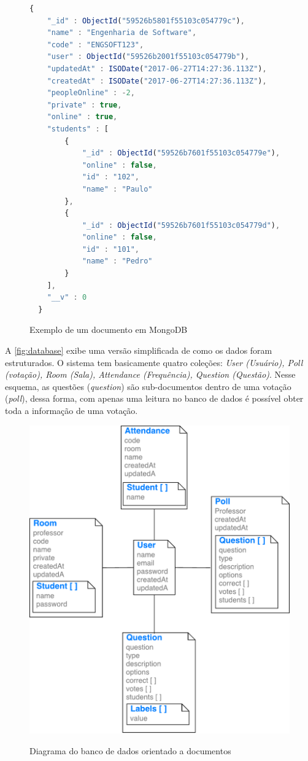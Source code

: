\begin{figure}[ht]
  \caption{Exemplo de um documento em MongoDB}
  \label{fig:mongodocument}
  \begin{lstlisting}[language=JavaScript]
  {
  	"_id" : ObjectId("59526b5801f55103c054779c"),
  	"name" : "Engenharia de Software",
  	"code" : "ENGSOFT123",
  	"user" : ObjectId("59526b2001f55103c054779b"),
  	"updatedAt" : ISODate("2017-06-27T14:27:36.113Z"),
  	"createdAt" : ISODate("2017-06-27T14:27:36.113Z"),
  	"peopleOnline" : -2,
  	"private" : true,
  	"online" : true,
  	"students" : [
  		{
  			"_id" : ObjectId("59526b7601f55103c054779e"),
  			"online" : false,
  			"id" : "102",
  			"name" : "Paulo"
  		},
  		{
  			"_id" : ObjectId("59526b7601f55103c054779d"),
  			"online" : false,
  			"id" : "101",
  			"name" : "Pedro"
  		}
  	],
  	"__v" : 0
  }
  \end{lstlisting}
  \doautor
\end{figure}

A \autoref{fig:database} exibe uma versão simplificada de como os dados
foram estruturados. O sistema tem basicamente quatro coleções:
\textit{User (Usuário), Poll (votação), Room (Sala), Attendance (Frequência), Question (Questão)}.
Nesse esquema, as questões (\textit{question}) são sub-documentos dentro de uma votação (\textit{poll}), dessa forma,
com apenas uma leitura no banco de dados é possível obter toda a informação de uma votação.

\begin{figure}[!ht]
  \centering
  \caption{Diagrama do banco de dados orientado a documentos}
  \includegraphics[scale=0.75,valign=t]{imagens/database}
  \doautor
  \label{fig:database}
\end{figure}

